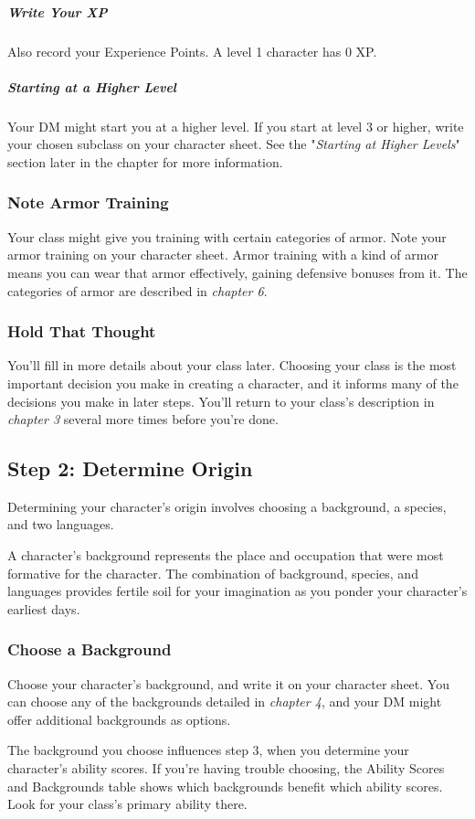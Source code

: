\documentclass[10pt,a4paper,twoside,bg=print,twocolumn,openany,nodeprecatedcode]{dndbook}
\begin{document}
\subparagraph{Write Your XP}
Also record your Experience Points. A level 1 character has 0 XP.

\subparagraph{Starting at a Higher Level}
Your DM might start you at a higher level. If you start at level 3 or higher, write your chosen subclass on your character sheet. See the "\textit{Starting at Higher Levels}" section later in the chapter for more information.

\subsubsection{Note Armor Training}
Your class might give you training with certain categories of armor. Note your armor training on your character sheet. Armor training with a kind of armor means you can wear that armor effectively, gaining defensive bonuses from it. The categories of armor are described in \textit{chapter 6}.

\subsubsection{Hold That Thought}
You'll fill in more details about your class later. Choosing your class is the most important decision you make in creating a character, and it informs many of the decisions you make in later steps. You'll return to your class's description in \textit{chapter 3} several more times before you're done.

\subsection{Step 2: Determine Origin}
Determining your character's origin involves choosing a background, a species, and two languages.

A character's background represents the place and occupation that were most formative for the character. The combination of background, species, and languages provides fertile soil for your imagination as you ponder your character's earliest days.

\subsubsection{Choose a Background}
Choose your character's background, and write it on your character sheet. You can choose any of the backgrounds detailed in \textit{chapter 4}, and your DM might offer additional backgrounds as options.

The background you choose influences step 3, when you determine your character's ability scores. If you're having trouble choosing, the Ability Scores and Backgrounds table shows which backgrounds benefit which ability scores. Look for your class's primary ability there.
\end{document}
